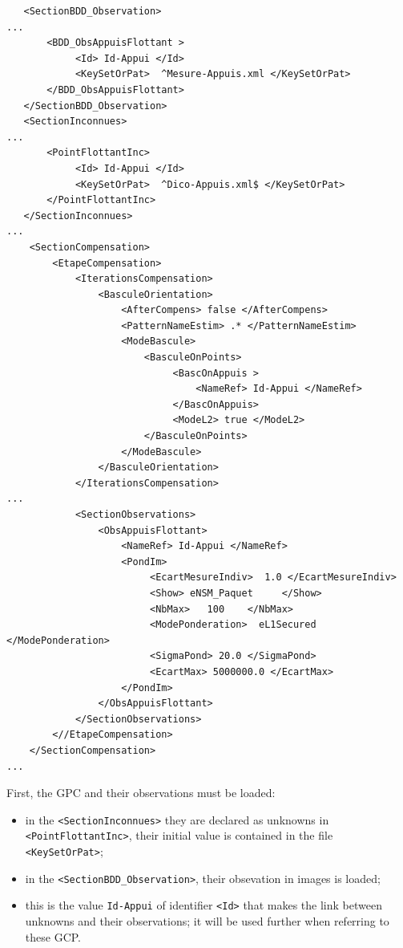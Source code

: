 {\scriptsize
\begin{verbatim}
   <SectionBDD_Observation>
...
       <BDD_ObsAppuisFlottant >
            <Id> Id-Appui </Id>
            <KeySetOrPat>  ^Mesure-Appuis.xml </KeySetOrPat>
       </BDD_ObsAppuisFlottant>
   </SectionBDD_Observation>
   <SectionInconnues>
...
       <PointFlottantInc>
            <Id> Id-Appui </Id>
            <KeySetOrPat>  ^Dico-Appuis.xml$ </KeySetOrPat>
       </PointFlottantInc>
   </SectionInconnues>
...
    <SectionCompensation>
        <EtapeCompensation>
            <IterationsCompensation>
                <BasculeOrientation>
                    <AfterCompens> false </AfterCompens>
                    <PatternNameEstim> .* </PatternNameEstim>
                    <ModeBascule>
                        <BasculeOnPoints>
                             <BascOnAppuis >
                                 <NameRef> Id-Appui </NameRef>
                             </BascOnAppuis>
                             <ModeL2> true </ModeL2>
                        </BasculeOnPoints>
                    </ModeBascule>
                </BasculeOrientation>
            </IterationsCompensation>
...
            <SectionObservations>
                <ObsAppuisFlottant>
                    <NameRef> Id-Appui </NameRef>
                    <PondIm>
                         <EcartMesureIndiv>  1.0 </EcartMesureIndiv>
                         <Show> eNSM_Paquet     </Show>
                         <NbMax>   100    </NbMax>
                         <ModePonderation>  eL1Secured </ModePonderation>
                         <SigmaPond> 20.0 </SigmaPond>
                         <EcartMax> 5000000.0 </EcartMax>
                    </PondIm>
                </ObsAppuisFlottant>
            </SectionObservations>
        <//EtapeCompensation>
    </SectionCompensation>
...
\end{verbatim}
}

First, the GPC and their observations must be loaded:

\begin{itemize}
   \item in the {\tt <SectionInconnues>} they are declared as unknowns in {\tt <PointFlottantInc>},
         their initial value is contained in the file {\tt <KeySetOrPat>};

  \item  in the  {\tt <SectionBDD\_Observation>}, their obsevation in images is loaded;

   \item this is the value {\tt Id-Appui} of  identifier {\tt <Id>}
         that makes the link between unknowns and their observations; it will be used
         further when referring to these GCP.
\end{itemize}

